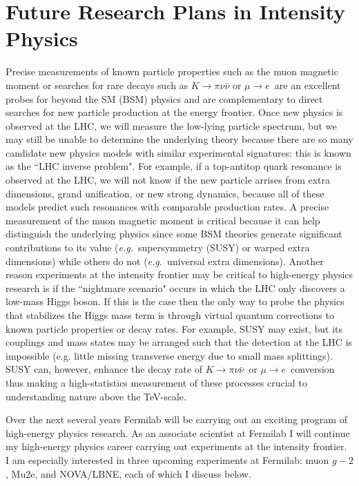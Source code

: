 \documentclass[12pt]{article}
\begin{document}
\section{Future Research Plans in Intensity Physics}
Precise measurements of known particle properties such as the muon magnetic moment or searches for rare decays such as $K \rightarrow \pi\nu\bar{\nu}$ or $\mu\rightarrow e$~are an excellent probes for beyond the SM (BSM) physics and are complementary to direct searches for new particle production at the energy frontier. Once new physics is observed at the LHC, we will measure the low-lying particle spectrum, but we may still be unable to determine the underlying theory because there are so many candidate new physics models with similar experimental signatures:  this is known as the ``LHC inverse problem". For example, if a top-antitop quark resonance is observed at the LHC, we will not know if the new particle arrises from extra dimensions, grand unification, or new strong dynamics, because all of these models predict such resonances with comparable production rates. A precise measurement of the muon magnetic moment is critical because it can help distinguish the underlying physics since some BSM theories generate significant contributions to its value ({\it{e.g.}}~supersymmetry (SUSY) or warped extra dimensions) while others do not ({\it{e.g.}}~universal extra dimensions). Another reason experiments at the intensity frontier may be critical to high-energy physics research is if the ``nightmare scenario" occurs in which the LHC only discovers a low-mass Higgs boson. If this is the case then the only way to probe the physics that stabilizes the Higgs mass term is through virtual quantum corrections to known particle properties or decay rates. For example, SUSY may exist, but its couplings and mass states may be arranged such that the detection at the LHC is impossible (e.g. little missing transverse energy due to small mass splittings). SUSY can, however, enhance the decay rate of $K \rightarrow \pi\nu\bar{\nu}$~or $\mu \rightarrow e$~conversion thus making a high-statistics measurement of these processes crucial to understanding nature above the TeV-scale.

Over the next several years Fermilab will be carrying out an exciting program of high-energy physics research. As an associate scientist at Fermilab I will continue my high-energy physics career carrying out experiments at the intensity frontier. I am especially interested in three upcoming experiments at Fermilab: muon $g-2$, Mu2e, and NOVA/LBNE, each of which I discuss below. 
\end{document}
